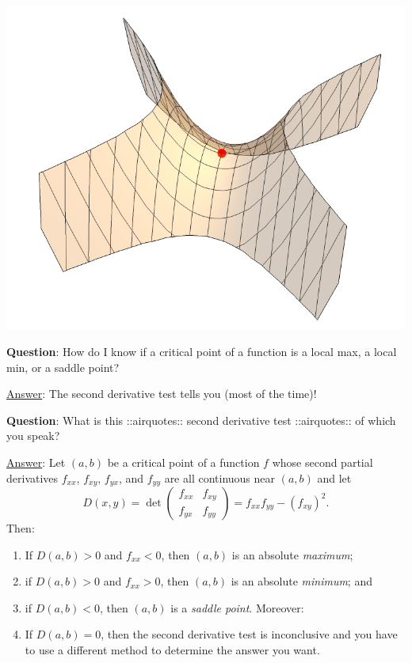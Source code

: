 \documentclass[12pt]{article}
\renewcommand{\Q}{\vspace{6mm}\noindent\textbf{Question}: }
\newcommand{\Ans}{\ul{Answer}: }
\begin{document}
	\begin{center}
		\includegraphics[scale=0.75]{saddlept}
	\end{center}

	\Q How do I know if a critical point of a function is a local max, a local min, or a saddle point?
	
	\Ans The second derivative test tells you (most of the time)!
	
	\newpage
	
	\Q What is this ::airquotes:: second derivative test ::airquotes:: of which you speak?
	
	\Ans Let $(a,b)$ be a critical point of a function $f$ whose second partial derivatives $f_{xx}$, $f_{xy}$, $f_{yx}$, and $f_{yy}$ are all continuous near $(a,b)$ and let 
	$$D(x,y)=\det\left(\begin{array}{cc}f_{xx} & f_{xy}\\ f_{yx} & f_{yy}\end{array}\right)=f_{xx}f_{yy}-\left(f_{xy}\right)^2.$$
	Then:
	\begin{enumerate}
		\item If $D(a,b)>0$ and $f_{xx}<0$, then $(a,b)$ is an absolute \textit{maximum};
		\item if $D(a,b)>0$ and $f_{xx}>0$, then $(a,b)$ is an absolute \textit{minimum}; and
		\item if $D(a,b)<0$, then $(a,b)$ is a \textit{saddle point}. Moreover:
		\item If $D(a,b)=0$, then the second derivative test is inconclusive and you have to use a different method to determine the answer you want.
	\end{enumerate}
\end{document}
